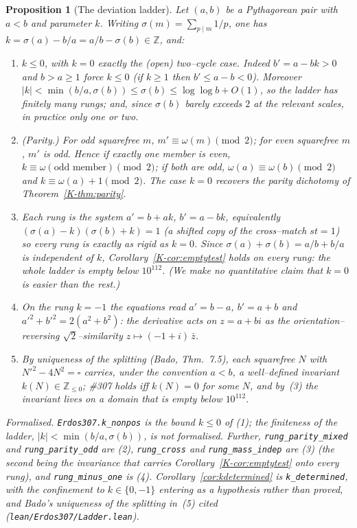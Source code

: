 \documentclass[11pt]{article}
\newtheorem{proposition}[theorem]{Proposition}
\theoremstyle{definition}
\begin{document}
\begin{proposition}[The deviation ladder]\label{prop:ladder}
Let $(a,b)$ be a Pythagorean pair with $a<b$ and parameter $k$. Writing
$\sigma(m)=\sum_{p\mid m}1/p$, one has $k=\sigma(a)-b/a=a/b-\sigma(b)\in\mathbb{Z}$, and:
\begin{enumerate}[label=\textup{(\arabic*)},leftmargin=2.2em]
\item $k\le0$, with $k=0$ exactly the \textup{(}open\textup{)} two--cycle case. Indeed $b'=a-bk>0$ and
$b>a\ge1$ force $k\le0$ \textup{(}if $k\ge1$ then $b'\le a-b<0$\textup{)}. Moreover
$|k|<\min(b/a,\sigma(b))\le\sigma(b)\le\log\log b+O(1)$, so the ladder has finitely many rungs; and,
since $\sigma(b)$ barely exceeds $2$ at the relevant scales, in practice only one or two.
\item \emph{(Parity.)} For odd squarefree $m$, $m'\equiv\omega(m)\pmod2$; for even squarefree $m$, $m'$
is odd. Hence if exactly one member is even, $k\equiv\omega(\text{odd member})\pmod2$; if both are odd,
$\omega(a)\equiv\omega(b)\pmod2$ and $k\equiv\omega(a)+1\pmod2$. The case $k=0$ recovers the parity
dichotomy of Theorem~\ref{K-thm:parity}.
\item Each rung is the system $a'=b+ak$, $b'=a-bk$, equivalently $(\sigma(a)-k)(\sigma(b)+k)=1$ (a
shifted copy of the cross--match $st=1$) so every rung is exactly as rigid as $k=0$. Since
$\sigma(a)+\sigma(b)=a/b+b/a$ is independent of $k$, Corollary~\ref{K-cor:emptytest} holds on \emph{every}
rung: the whole ladder is empty below $10^{112}$. (We make no quantitative claim that $k=0$ is easier
than the rest.)
\item On the rung $k=-1$ the equations read $a'=b-a$, $b'=a+b$ and $a'^2+b'^2=2(a^2+b^2)$: the
derivative acts on $z=a+bi$ as the orientation--reversing $\sqrt2$--similarity $z\mapsto(-1+i)\,\bar z$.
\item By uniqueness of the splitting \textup{(}Bado, Thm.~7.5\textup{)}, each squarefree $N$ with
$N'^2-4N^2=\square$ carries, under the convention $a<b$, a well--defined invariant
$k(N)\in\mathbb{Z}_{\le0}$; \#307 holds iff $k(N)=0$ for some $N$, and by~(3) the invariant lives on a
domain that is empty below $10^{112}$.
\end{enumerate}

\textup{Formalised.} \texttt{Erdos307.k\_nonpos} is the bound $k\le0$ of \textup{(1)}; the
finiteness of the ladder, $|k|<\min(b/a,\sigma(b))$, is not formalised. Further, \texttt{rung\_parity\_mixed} and
\texttt{rung\_parity\_odd} are \textup{(2)}, \texttt{rung\_cross} and \texttt{rung\_mass\_indep} are
\textup{(3)} \textup{(}the second being the invariance that carries
Corollary~\ref{K-cor:emptytest} onto every rung\textup{)}, and \texttt{rung\_minus\_one} is
\textup{(4)}. Corollary~\ref{cor:kdetermined} is \texttt{k\_determined}, with the confinement to
$k\in\{0,-1\}$ entering as a hypothesis rather than proved, and Bado's uniqueness of the splitting
in~\textup{(5)} cited \textup{(\texttt{lean/Erdos307/Ladder.lean})}.
\end{proposition}
\end{document}
